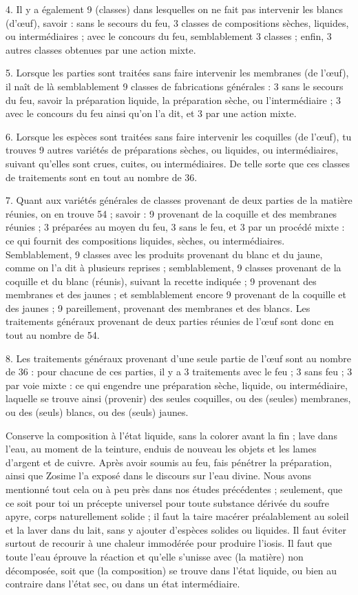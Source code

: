 \documentclass[a4paper, 11pt, oneside, polutonikogreek, french]{article}
\begin{document}
4. Il y a également 9 (classes) dans lesquelles on ne fait pas intervenir les blancs (d'œuf), savoir : sans le secours du feu, 3 classes de compositions sèches, liquides, ou intermédiaires ; avec le concours du feu, semblablement 3 classes ; enfin, 3 autres classes obtenues par une action mixte.

5. Lorsque les parties sont traitées sans faire intervenir les membranes (de l'œuf), il naît de là semblablement 9 classes de fabrications générales : 3 sans le secours du feu, savoir la préparation liquide, la préparation sèche, ou l'intermédiaire ; 3 avec le concours du feu ainsi qu'on l'a dit, et 3 par une action mixte.

6. Lorsque les espèces sont traitées sans faire intervenir les coquilles (de l'œuf), tu trouves 9 autres variétés de préparations sèches, ou liquides, ou intermédiaires, suivant qu'elles sont crues, cuites, ou intermédiaires. De telle sorte que ces classes de traitements sont en tout au nombre de 36.

7. Quant aux variétés générales de classes provenant de deux parties de la matière réunies, on en trouve 54 ; savoir : 9 provenant de la coquille et des membranes réunies ; 3 préparées au moyen du feu, 3 sans le feu, et 3 par un procédé mixte : ce qui fournit des compositions liquides, sèches, ou intermédiaires. Semblablement, 9 classes avec les produits provenant du blanc et du jaune, comme on l'a dit à plusieurs reprises ; semblablement, 9 classes provenant de la coquille et du blanc (réunis), suivant la recette indiquée ; 9 provenant des membranes et des jaunes ; et semblablement encore 9 provenant de la coquille et des jaunes ; 9 pareillement, provenant des membranes et des blancs. Les traitements généraux provenant de deux parties réunies de l'œuf sont donc en tout au nombre de 54.

8. Les traitements généraux provenant d'une seule partie de l'œuf sont au nombre de 36 : pour chacune de ces parties, il y a 3 traitements avec le feu ; 3 sans feu ; 3 par voie mixte : ce qui engendre une préparation sèche, liquide, ou intermédiaire, laquelle se trouve ainsi (provenir) des seules coquilles, ou des (seules) membranes, ou des (seuls) blancs, ou des (seuls) jaunes.

Conserve la composition à l'état liquide, sans la colorer avant la fin ; lave dans l'eau, au moment de la teinture, enduis de nouveau les objets et les lames d'argent et de cuivre. Après avoir soumis au feu, fais pénétrer la préparation, ainsi que Zosime l'a exposé dans le discours sur l'eau divine. Nous avons mentionné tout cela ou à peu près dans nos études précédentes ; seulement, que ce soit pour toi un précepte universel pour toute substance dérivée du soufre apyre, corps naturellement solide ; il faut la taire macérer préalablement au soleil et la laver dans du lait, sans y ajouter d'espèces solides ou liquides. Il faut éviter surtout de recourir à une chaleur immodérée pour produire l'iosis. Il faut que toute l'eau éprouve la réaction et qu'elle s'unisse avec (la matière) non décomposée, soit que (la composition) se trouve dans l'état liquide, ou bien au contraire dans l'état sec, ou dans un état intermédiaire.
\end{document}
